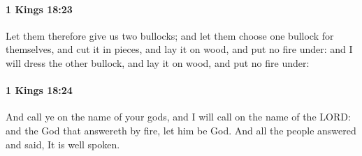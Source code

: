 		\paragraph{1 Kings 18:23} %
			\label{1KINGS-18-23}

			Let them therefore give us two bullocks; and let them choose one bullock for themselves, and cut it in pieces, and lay it on wood, and put no fire under: and I will dress the other bullock, and lay it on wood, and put no fire under:


		\paragraph{1 Kings 18:24} %
			\label{1KINGS-18-24}

			And call ye on the name of your gods, and I will call on the name of the LORD: and the God that answereth by fire, let him be God. And all the people answered and said, It is well spoken.

